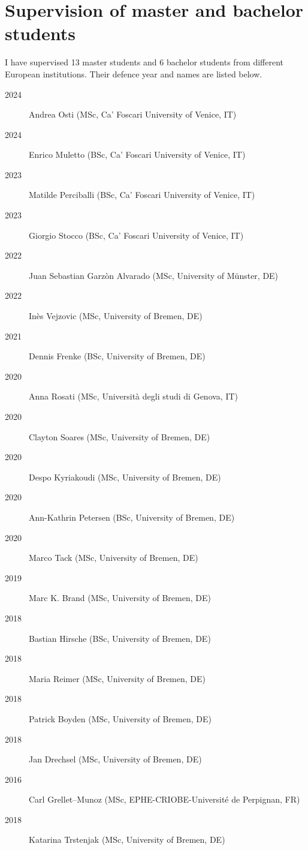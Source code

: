 \documentclass[11pt]{article}
\begin{document}
\section{Supervision of master and bachelor students}
{\normalfont I have supervised 13 master students and 6 bachelor students from different European institutions. Their defence year and names are listed below.}\\
{\footnotesize 
\begin{description}
  \item [2024] Andrea Osti (MSc, Ca' Foscari University of Venice, IT) 
  \item [2024] Enrico Muletto (BSc, Ca' Foscari University of Venice, IT) 
  \item [2023] Matilde Perciballi (BSc, Ca' Foscari University of Venice, IT)
  \item [2023] Giorgio Stocco (BSc, Ca' Foscari University of Venice, IT)  
  \item [2022] Juan Sebastian Garzòn Alvarado (MSc, University of Münster, DE)
  \item [2022] Inès Vejzovic (MSc, University of Bremen, DE)
  \item [2021] Dennis Frenke (BSc, University of Bremen, DE)
  \item [2020] Anna Rosati (MSc, Università degli studi di Genova, IT)
  \item [2020] Clayton Soares (MSc, University of Bremen, DE)
  \item [2020] Despo Kyriakoudi (MSc, University of Bremen, DE)
  \item [2020] Ann-Kathrin Petersen (BSc, University of Bremen, DE)
  \item [2020] Marco Tack (MSc, University of Bremen, DE)
  \item [2019] Marc K. Brand (MSc, University of Bremen, DE)
  \item [2018] Bastian Hirsche (BSc, University of Bremen, DE)
  \item [2018] Maria Reimer (MSc, University of Bremen, DE)
  \item [2018] Patrick Boyden (MSc, University of Bremen, DE)
  \item [2018] Jan Drechsel (MSc, University of Bremen, DE)
  \item [2016] Carl Grellet–Munoz (MSc, EPHE-CRIOBE-Université de Perpignan, FR)
  \item [2018] Katarina Trstenjak (MSc, University of Bremen, DE)
\end{description}}
\end{document}

